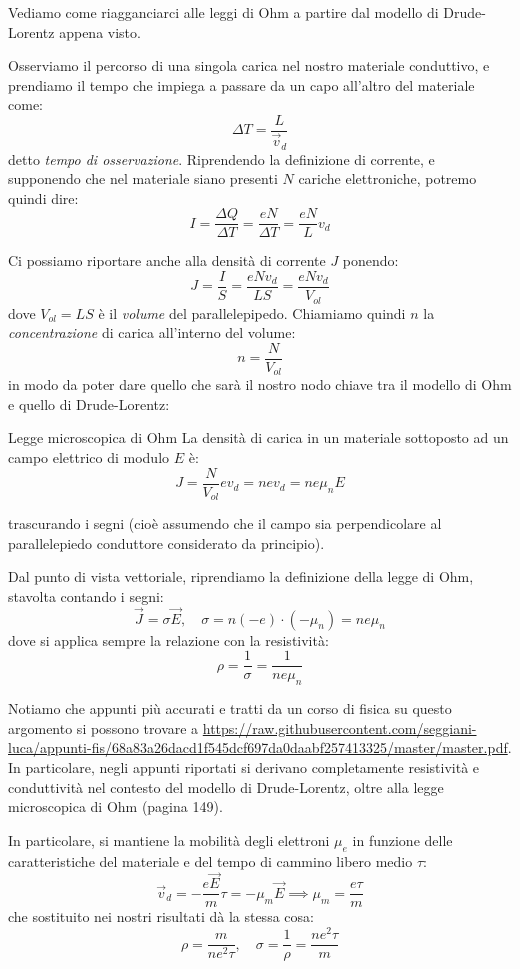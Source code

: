\documentclass[a4paper,11pt]{article}
\begin{document}
\noindent
Vediamo come riagganciarci alle leggi di Ohm a partire dal modello di Drude-Lorentz appena visto.

Osserviamo il percorso di una singola carica nel nostro materiale conduttivo, e prendiamo il tempo che impiega a passare da un capo all'altro del materiale come:
$$
\Delta T = \frac{L}{\vec{v}_d}
$$
detto \textit{tempo di osservazione}. Riprendendo la definizione di corrente, e supponendo che nel materiale siano presenti $N$ cariche elettroniche, potremo quindi dire:
$$
I = \frac{\Delta Q}{\Delta T} = \frac{e N}{\Delta T} = \frac{e N}{L} v_d
$$

Ci possiamo riportare anche alla densità di corrente $J$ ponendo:
$$
J = \frac{I}{S} = \frac{e N v_d}{LS} = \frac{e N v_d}{V_{ol}} 
$$
dove $V_{ol} = LS$ è il \textit{volume} del parallelepipedo.
Chiamiamo quindi $n$ la \textit{concentrazione} di carica all'interno del volume:
$$
n = \frac{N}{V_{ol}}
$$
in modo da poter dare quello che sarà il nostro nodo chiave tra il modello di Ohm e quello di Drude-Lorentz:
\begin{definition}{Legge microscopica di Ohm}
La densità di carica in un materiale sottoposto ad un campo elettrico di modulo $E$ è:	
$$
J = \frac{N}{V_{ol}} e v_d = n e v_d = n e \mu_n E
$$
\end{definition}
\noindent
trascurando i segni (cioè assumendo che il campo sia perpendicolare al parallelepiedo conduttore considerato da principio).

Dal punto di vista vettoriale, riprendiamo la definizione della legge di Ohm, stavolta contando i segni:
$$
\vec{J} = \sigma \vec{E}, \quad \sigma = n (- e) \cdot (- \mu_n) = n e \mu_n 
$$
dove si applica sempre la relazione con la resistività:
$$
\rho = \frac{1}{\sigma} = \frac{1}{n e \mu_n}
$$

\newpage

Notiamo che appunti più accurati e tratti da un corso di fisica su questo argomento si possono trovare a \url{https://raw.githubusercontent.com/seggiani-luca/appunti-fis/68a83a26dacd1f545dcf697da0daabf257413325/master/master.pdf}. In particolare, negli appunti riportati si derivano completamente resistività e conduttività nel contesto del modello di Drude-Lorentz, oltre alla legge microscopica di Ohm (pagina 149).

In particolare, si mantiene la mobilità degli elettroni $\mu_e$ in funzione delle caratteristiche del materiale e del tempo di cammino libero medio $\tau$:
$$
\vec{v}_d = -\frac{e \vec{E}}{m} \tau = - \mu_m \vec{E} \implies \mu_m = \frac{e \tau}{m}
$$
che sostituito nei nostri risultati dà la stessa cosa:
$$
\rho = \frac{m}{n e^2 \tau}, \quad \sigma = \frac{1}{\rho} = \frac{n e^2 \tau}{m}
$$
\end{document}
